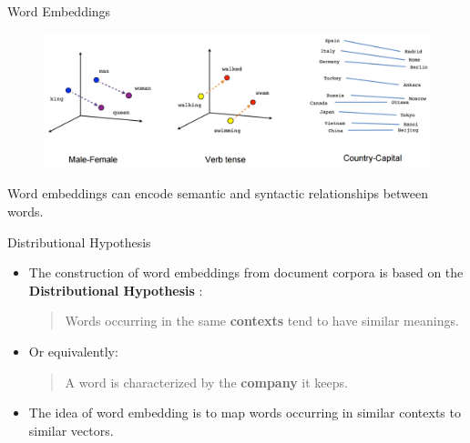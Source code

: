 \documentclass[handout]{beamer}
\begin{document}
\begin{frame}{Word Embeddings}
\begin{figure}[h]
  \includegraphics[scale=0.17]{pics/embeddings.png}
\end{figure}
Word embeddings can encode semantic and syntactic relationships between words.


\end{frame}




\begin{frame}{Distributional Hypothesis}
\begin{scriptsize}
\begin{itemize}
\item The construction of word embeddings from document corpora is based on the  \textbf{Distributional Hypothesis} \cite{harris1954}: \\
\begin{quote}
 Words occurring in the same \textbf{contexts} tend to have similar meanings.
\end{quote}

\item Or equivalently:
\begin{quote}
A word is characterized by the \textbf{company} it keeps.
\end{quote}


\item The idea of word embedding is to map words occurring in similar contexts to similar vectors.

\end{itemize}
\end{scriptsize}
\end{frame}
\end{document}

